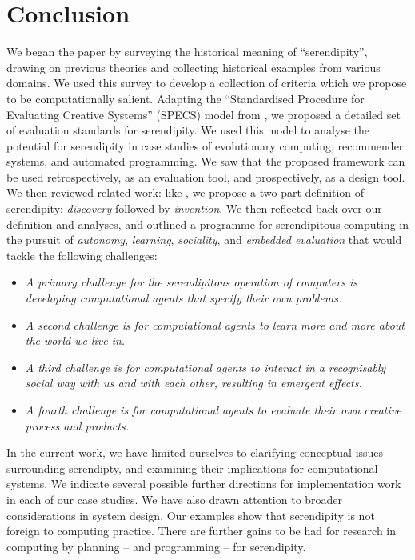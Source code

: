 \section{Conclusion} \label{sec:conclusion}

%
We began the paper by surveying the historical meaning of
``serendipity'', drawing on previous theories and collecting
historical examples from various domains.  We used this survey to
develop a collection of criteria which we propose to be
computationally salient.
%
Adapting the ``Standardised Procedure for Evaluating Creative
Systems'' (SPECS) model from , we proposed a
detailed set of evaluation standards for serendipity.
%
We used this model to analyse the potential for serendipity in case
studies of evolutionary computing, recommender systems, and automated
programming.  We saw that the proposed framework can be used
retrospectively, as an evaluation tool, and prospectively, as a design
tool.
%
We then reviewed related work: like
, we propose a two-part definition of
serendipity: \emph{discovery} followed by \emph{invention}.
%
We then reflected back over our definition and analyses, and outlined
a programme for serendipitous computing in the pursuit of
\emph{autonomy}, \emph{learning}, \emph{sociality}, and \emph{embedded
  evaluation} that would tackle the following challenges:
%
\begin{itemize}
\item \emph{A primary challenge for the serendipitous operation of
  computers is developing computational agents that specify their own
  problems.}
\item \emph{A second challenge is for computational agents to learn
  more and more about the world we live in.}
\item \emph{A third challenge is for computational agents to interact
  in a recognisably social way with us and with each other, resulting
  in emergent effects.}
\item \emph{A fourth challenge is for computational agents to evaluate
  their own creative process and products.}
\end{itemize}
%
In the current work, we have limited ourselves to clarifying
conceptual issues surrounding serendipty, and examining their
implications for computational systems.
% 
We indicate several possible further directions for implementation
work in each of our case studies.  We have also drawn attention to
broader considerations in system design.  Our examples show that
serendipity is not foreign to computing practice.  There are further
gains to be had for research in computing by planning -- and
programming -- for serendipity.
%

